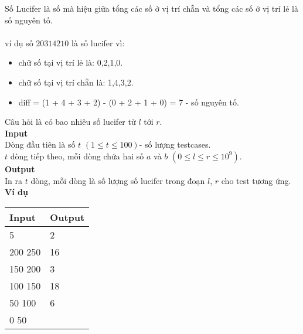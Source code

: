 Số Lucifer là số mà hiệu giữa tổng các số ở vị trí chẵn và tổng các số ở vị trí lẻ là số nguyên tố. 
\\
\\
ví dụ số $20314210$ là số lucifer vì:
\begin{itemize}
    \item chữ số tại vị trí lẻ là: 0,2,1,0. 
    \item chữ số tại vị trí chẵn là: 1,4,3,2.
    \item diff = (1 + 4 + 3 + 2) - (0 + 2 + 1 + 0) = 7 - số nguyên tố.
\end{itemize}
Câu hỏi là có bao nhiêu số lucifer từ $l$ tới $r$.
\\

\textbf{Input}
\\
Dòng đầu tiên là số $t$ $(1 \leq t \leq 100)$- số lượng testcases.
\\
$t$ dòng tiếp theo, mỗi dòng chứa hai số $a$ và $b$ $(0 \leq l \leq r \leq 10^{9})$.
\\

\textbf{Output}
\\
In ra $t$ dòng, mỗi dòng là số lượng số lucifer trong đoạn $l$, $r$ cho test tương ứng.
\\

\textbf{Ví dụ}
\begin{table}[h!]
    \begin{center}
        \begin{tabular}{|p{6cm}|p{6cm}|}
            \hline
            \textbf{Input} & \textbf{Output} \\ 
            \hline
            5 & 2 \\ 
            200 250 & 16 \\
            150 200 & 3 \\
            100 150 & 18 \\
            50 100 & 6 \\
            0 50 & \\
            \hline
        \end{tabular}
    \end{center}
\end{table}



